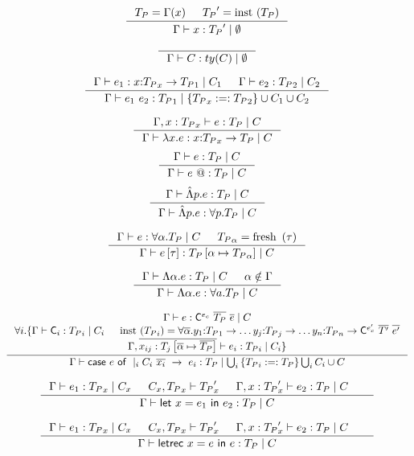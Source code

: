 \documentclass[10pt,a4paper]{article}
\begin{document}
\hfill{}

$$
\inference{
	\pdTy = \penv(x) && \pdTy' = \pdinst{\pdTy}
}{
	\hasTypeP{\penv}{x}{\pdTy'}{\emptyset}
}[]
$$

$$
\inference{
}{
	\hasTypeP{\penv}{C}{ty(C)}{\emptyset}
}[]
$$

$$
\inference{
	\hasTypeP{\penv}{e_1}{\tfun{x}{\pdTy_x}{\pdTy_1}}{C_1} &
	\hasTypeP{\penv}{e_2}{\pdTy_2}{C_2}
}{
	\hasTypeP{\penv}{\eapp{e_1}{e_2}}{\pdTy_1}{ \{\pdTy_x :=: \pdTy_2 \} \cup C_1 \cup C_2}
}[]
$$

$$
\inference{
	\hasTypeP{\penv, x : \pdTy_x}{e}{\pdTy}{C}
}{
	\hasTypeP{\penv}{\elam{x}{e}}{\tfun{x}{\pdTy_x}{\pdTy}}{C}
}[]
$$
$$
\inference{
	\hasTypeP{\penv}{e}{\pdTy}{C}
}{
	\hasTypeP{\penv}{\epapp{e}}{\pdTy}{C}
}[]
$$
$$
\inference{
	\hasTypeP{\penv}{\eplam{p}{e}}{\pdTy}{C}
}{
	\hasTypeP{\penv}{\eplam{p}{e}}{\tforallPr{p}{\pdTy}}{C}
}[]
$$

$$
\inference{
	\hasTypeP{\penv}{e}{\tforallTy{\alpha}{\pdTy}}{C} & \pdTy_\alpha = \freshT{\tau}
}{
	\hasTypeP{\penv}{\etapp{e}{\tau}}{\pdTy \sub{\alpha}{\pdTy_\alpha}}{C}
}[]
$$

$$
\inference{
	\hasTypeP{\penv}{\etlam{\alpha}{e}}{\pdTy}{C} & \alpha \notin \penv
}{
	\hasTypeP{\penv}{\etlam{\alpha}{e}}{\tforallTy{a}{\pdTy}}{C}
}[]
$$

$$
\inference{
	\hasTypeP{\penv}{e}
		{\tcon{\nhaskell{C}}{e_c}{\listOf{\pdTy}}{\listOf{e}}}{C} \\
	\forall i . \{
		\hasTypeP{\penv}{\nhaskell{C}_i}{\pdTy_i}{C_i} && 
		    \pdinst{\pdTy_i} = 
			{\tforallTy{\listOf{\alpha}}{
				\tfun{y_1}{\pdTy_1}{
				\tfun{\dots y_j}{\pdTy_j}{
				\tfun{\dots y_n}{\pdTy_n}{
				\tcon{\nhaskell{C}}{e'_c}{\listOf{\dTy'}}{\listOf{e'}}}}			
			}}} \\			
		\hasTypeP{\penv, \listOf{x_{ij} : {\dTy_j \subT{\listOf{\alpha}}{\listOf{\pdTy}} }}}{e_i}{\pdTy_i}{C_i}	
	\}
}{
	\hasTypeP{\penv}{\ecase{e}{C_i \ \listOf{x_i}}{e_i}}{\pdTy}{\bigcup_{i}{\{ \pdTy_i :=: \pdTy \}} \bigcup_{i} C_i \cup C}
}[]
$$

$$
\inference{
	\hasTypeP{\penv}{e_1}{\pdTy_x}{C_x} & \generalizeP{C_x}{\pdTy_x}{\pdTy_x'} &
	\hasTypeP{\penv, x:\pdTy_x'}{e_2}{\pdTy}{C} &
}{
	\hasTypeP{\penv}{\elet{x}{e_1}{e_2}}{\pdTy}{C}
}[]
$$

$$
\inference{
	\hasTypeP{\penv}{e_1}{\pdTy_x}{C_x} & \generalizeP{C_x}{\pdTy_x}{\pdTy_x'} &
	\hasTypeP{\penv, x:\pdTy_x'}{e_2}{\pdTy}{C} &
}{
	\hasTypeP{\penv}{\eletrec{x}{e}{e}}{\pdTy}{C}
}[]
$$
\end{document}
